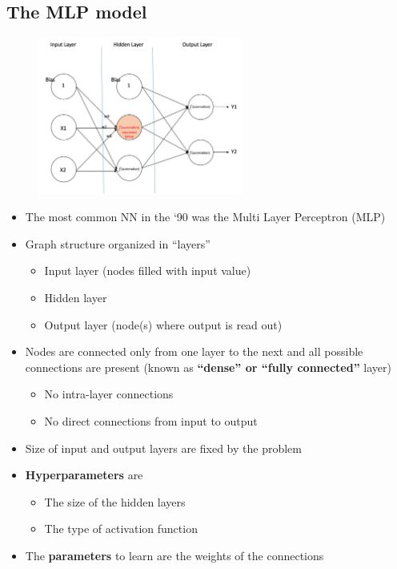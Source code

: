 \subsection{The MLP model}

\begin{figure}
	\includegraphics[width=0.6\textwidth]{figure_ml/mlp.png}
\end{figure} 
\quad
\begin{itemize}
	\item The most common NN in the ‘90 was the Multi Layer	Perceptron (MLP)
	\item Graph structure organized in “layers”
	\begin{itemize}
		\item Input layer (nodes filled with input value)
		\item Hidden layer
		\item Output layer (node(s) where output is read out)
	\end{itemize}
	\item Nodes are connected only from one layer to the next and all possible connections are present (known as \textbf{“dense” or “fully connected”} layer)
	\begin{itemize}
		\item No intra-layer connections
		\item No direct connections from input to output
	\end{itemize}
	\item Size of input and output layers are fixed by the problem
	\item \textbf{Hyperparameters} are
	\begin{itemize}
		\item The size of the hidden layers
		\item The type of activation function
	\end{itemize}
	\item The \textbf{parameters} to learn are the weights of the connections
\end{itemize}

